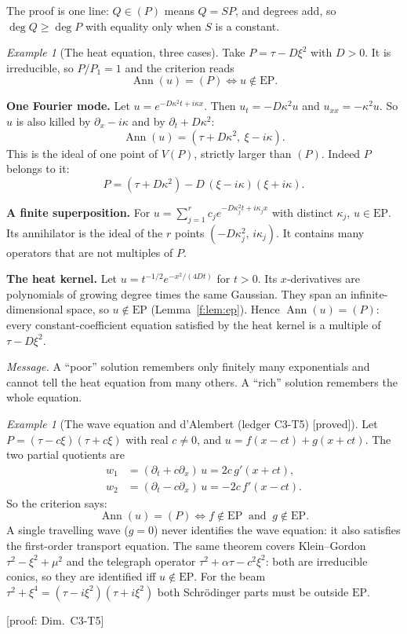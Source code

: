 \documentclass[11pt]{article}
\theoremstyle{plain}
\theoremstyle{definition}
\theoremstyle{remark}
\newtheorem{example}[theorem]{Example}
\DeclareMathOperator{\Ann}{Ann}             %
\newcommand{\Var}{V}                        %
\newcommand{\EP}{\mathrm{EP}}               %
\newcommand{\badge}[2]{\textcolor{#1}{\textsf{\footnotesize[#2]}}}
\newcommand{\proved}[1][]{\badge{cC}{proved#1}}
\newcommand{\led}[1]{\textcolor{cG}{\textsf{\footnotesize(ledger #1)}}}
\newcommand{\dimref}[1]{\textsf{\footnotesize[proof: Dim.~#1]}}
\begin{document}
The proof is one line: $Q\in(P)$ means $Q=SP$, and degrees add, so $\deg Q\ge\deg P$ with equality only when $S$ is a constant.

\begin{example}[{The heat equation, three cases}]\label{ex:heat3}
Take $P=\tau-D\xi^2$ with $D>0$. It is irreducible, so $P/P_1=1$ and the criterion reads
\[
\Ann(u)=(P)\iff u\notin\EP .
\]

\textbf{One Fourier mode.} Let $u=e^{-D\kappa^2t+i\kappa x}$. Then $u_t=-D\kappa^2u$ and $u_{xx}=-\kappa^2u$. So $u$ is also killed by $\partial_x-i\kappa$ and by $\partial_t+D\kappa^2$:
\[
\Ann(u)=(\tau+D\kappa^2,\ \xi-i\kappa).
\]
This is the ideal of one point of $\Var(P)$, strictly larger than $(P)$. Indeed $P$ belongs to it:
\[
P=(\tau+D\kappa^2)-D\,(\xi-i\kappa)(\xi+i\kappa).
\]

\textbf{A finite superposition.} For $u=\sum_{j=1}^rc_je^{-D\kappa_j^2t+i\kappa_jx}$ with distinct $\kappa_j$, $u\in\EP$. Its annihilator is the ideal of the $r$ points $(-D\kappa_j^2,\,i\kappa_j)$. It contains many operators that are not multiples of $P$.

\textbf{The heat kernel.} Let $u=t^{-1/2}e^{-x^2/(4Dt)}$ for $t>0$. Its $x$-derivatives are polynomials of growing degree times the same Gaussian. They span an infinite-dimensional space, so $u\notin\EP$ (Lemma~\ref{f:lem:ep}). Hence $\Ann(u)=(P)$: every constant-coefficient equation satisfied by the heat kernel is a multiple of $\tau-D\xi^2$.

\emph{Message.} A ``poor'' solution remembers only finitely many exponentials and cannot tell the heat equation from many others. A ``rich'' solution remembers the whole equation.
\end{example}

\begin{example}[{The wave equation and d'Alembert \led{C3-T5} \proved}]\label{ex:wave-ident}
Let $P=(\tau-c\xi)(\tau+c\xi)$ with real $c\ne0$, and $u=f(x-ct)+g(x+ct)$. The two partial quotients are
\begin{align*}
w_1&=(\partial_t+c\partial_x)\,u=2c\,g'(x+ct),\\
w_2&=(\partial_t-c\partial_x)\,u=-2c\,f'(x-ct).
\end{align*}
So the criterion says:
\[
\Ann(u)=(P)\iff f\notin\EP\ \text{ and }\ g\notin\EP .
\]
A single travelling wave ($g=0$) never identifies the wave equation: it also satisfies the first-order transport equation. The same theorem covers Klein--Gordon $\tau^2-\xi^2+\mu^2$ and the telegraph operator $\tau^2+\alpha\tau-c^2\xi^2$: both are irreducible conics, so they are identified iff $u\notin\EP$. For the beam $\tau^2+\xi^4=(\tau-i\xi^2)(\tau+i\xi^2)$ both Schr\"odinger parts must be outside $\EP$.

\dimref{C3-T5}
\end{example}
\end{document}
